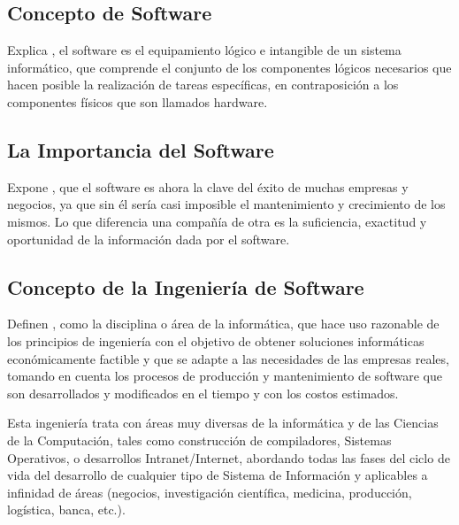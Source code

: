 \documentclass[12pt]{article}
\begin{document}
	\subsection{Concepto de Software}

	\hspace{1.27cm}Explica \textcite{maida_metodologias_2015}, el software es el equipamiento lógico e intangible de un sistema informático, que comprende el conjunto de los componentes lógicos necesarios que hacen posible la realización de tareas específicas,
	en contraposición a los componentes físicos que son llamados hardware.

	\subsection{La Importancia del Software}

	\hspace{1.27cm}Expone \textcite{maida_metodologias_2015}, que el software es ahora la clave del éxito de muchas empresas y negocios, ya que sin él sería casi imposible el mantenimiento y crecimiento de los mismos. Lo que diferencia una compañía de otra es la suficiencia, exactitud y oportunidad de la información dada por el software.

	\subsection{Concepto de la Ingeniería de Software}

	\hspace{1.27cm}Definen \textcite{maida_metodologias_2015}, como la disciplina o área de la informática, que hace uso razonable de los principios de ingeniería con el objetivo de obtener soluciones informáticas económicamente factible y que se adapte a las necesidades de las empresas reales, tomando en cuenta los procesos de producción y mantenimiento de software que son desarrollados y modificados en el tiempo y con los costos estimados.

	\hspace{1.27cm}Esta ingeniería trata con áreas muy diversas de la informática y de las Ciencias de la Computación, tales como construcción de compiladores, Sistemas Operativos, o desarrollos Intranet/Internet, abordando todas las fases del ciclo de vida del desarrollo de cualquier tipo de Sistema de Información y aplicables a infinidad de áreas (negocios, investigación científica, medicina, producción, logística, banca, etc.).
\end{document}
